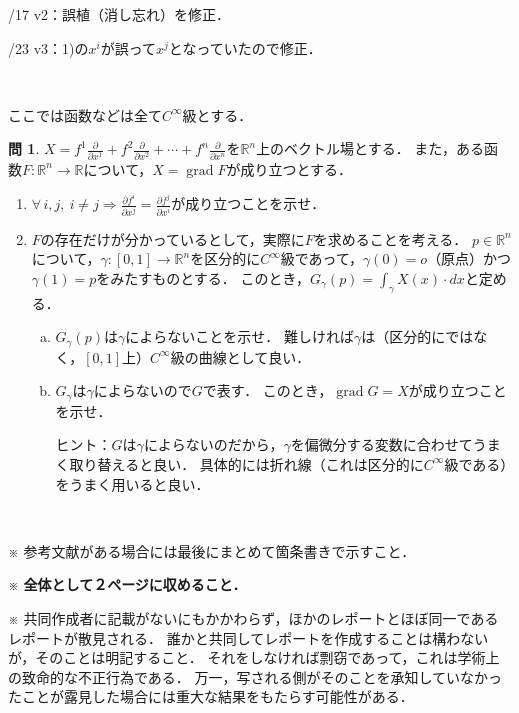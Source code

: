 \documentclass[dvipdfmx,uplatex]{jsarticle}
\DeclareMathOperator{\grad}{\mathrm{grad}}
\newcommand\R{\mathbb{R}}
\theoremstyle{definition}
\newtheorem*{question*}{問}
\theoremstyle{StatementsWithStar}
\theoremstyle{StatementsWithStar2}
\theoremstyle{StatementsWithStar3}
\theoremstyle{StatementsWithCCirc}
\theoremstyle{definition}
\begin{document}
/17 v2：誤植（消し忘れ）を修正．\par{}/23 v3：1)の$x^i$が誤って$x^j$となっていたので修正．\par
\ \par
ここでは函数などは全て$C^\infty$級とする．
\begin{question*}
$X=f^1\frac{\partial}{\partial x^1}+f^2\frac{\partial}{\partial x^2}+\cdots+f^n\frac{\partial}{\partial x^n}$を$\R^n$上のベクトル場とする．
また，ある函数$F\colon\R^n\to\R$について，$X=\grad F$が成り立つとする．
\begin{enumerate}
\item
$\forall\,i,j,\ i\neq j\Rightarrow\frac{\partial f^i}{\partial x^j}=\frac{\partial f^j}{\partial x^i}$が成り立つことを示せ．
\item
$F$の存在だけが分かっているとして，実際に$F$を求めることを考える．
$p\in\R^n$について，$\gamma\colon[0,1]\to\R^n$を区分的に$C^\infty$級であって，$\gamma(0)=o$（原点）かつ$\gamma(1)=p$をみたすものとする．
このとき，$G_\gamma(p)=\int_\gamma X(x)\cdot dx$と定める．
\begin{enumerate}[a)]
\item
$G_\gamma(p)$は$\gamma$によらないことを示せ．
難しければ$\gamma$は（区分的にではなく，$[0,1]$上）$C^\infty$級の曲線として良い．
\item
$G_\gamma$は$\gamma$によらないので$G$で表す．
このとき，$\grad G=X$が成り立つことを示せ．
\par\noindent
ヒント：$G$は$\gamma$によらないのだから，$\gamma$を偏微分する変数に合わせてうまく取り替えると良い．
具体的には折れ線（これは区分的に$C^\infty$級である）をうまく用いると良い．
\end{enumerate}
\end{enumerate}
\end{question*}
\par
\ \par
\noindent
{\small
※ 参考文献がある場合には最後にまとめて箇条書きで示すこと．\par\noindent
※ \textbf{全体として２ページに収めること．}\par\noindent
※ 共同作成者に記載がないにもかかわらず，ほかのレポートとほぼ同一であるレポートが散見される．
誰かと共同してレポートを作成することは構わないが，そのことは明記すること．
それをしなければ剽窃であって，これは学術上の致命的な不正行為である．
万一，写される側がそのことを承知していなかったことが露見した場合には重大な結果をもたらす可能性がある．
}

\par
%
%
\noindent
\end{document}
